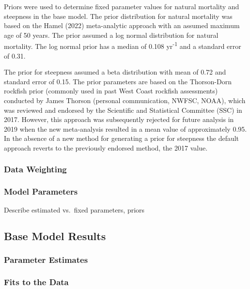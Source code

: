 \documentclass[11pt,
  english,
  letterpaper,
]{article}
\begin{document}
Priors were used to determine fixed parameter values for natural mortality and steepness in the base model. The prior distribution for natural mortality was based on the Hamel (2022) meta-analytic approach with an assumed maximum age of 50 years. The prior assumed a log normal distribution for natural mortality. The log normal prior has a median of 0.108 yr\textsuperscript{-1} and a standard error of 0.31.

The prior for steepness assumed a beta distribution with mean of 0.72 and standard error of 0.15. The prior parameters are based on the Thorson-Dorn rockfish prior (commonly used in past West Coast rockfish assessments) conducted by James Thorson (personal communication, NWFSC, NOAA), which was reviewed and endorsed by the Scientific and Statistical Committee (SSC) in 2017. However, this approach was subsequently rejected for future analysis in 2019 when the new meta-analysis resulted in a mean value of approximately 0.95. In the absence of a new method for generating a prior for steepness the default approach reverts to the previously endorsed method, the 2017 value.

\hypertarget{data-weighting}{%
\subsubsection{Data Weighting}\label{data-weighting}}

\hypertarget{model-parameters}{%
\subsubsection{Model Parameters}\label{model-parameters}}

Describe estimated vs.~fixed parameters, priors

\hypertarget{base-model-results}{%
\subsection{Base Model Results}\label{base-model-results}}

\hypertarget{parameter-estimates}{%
\subsubsection{Parameter Estimates}\label{parameter-estimates}}

\hypertarget{fits-to-the-data}{%
\subsubsection{Fits to the Data}\label{fits-to-the-data}}
\end{document}
